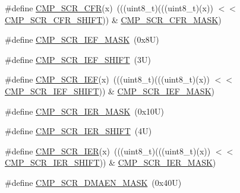 \begin{DoxyCompactItemize}
\#define \mbox{\hyperlink{group___c_m_p___register___masks_gae9adf37fae856f25e1caf7b4a48a7912}{C\+M\+P\+\_\+\+S\+C\+R\+\_\+\+C\+FR}}(x)~(((uint8\+\_\+t)(((uint8\+\_\+t)(x)) $<$$<$ \mbox{\hyperlink{group___c_m_p___register___masks_ga78595d16db987c96e73ce96fc5436f6b}{C\+M\+P\+\_\+\+S\+C\+R\+\_\+\+C\+F\+R\+\_\+\+S\+H\+I\+FT}})) \& \mbox{\hyperlink{group___c_m_p___register___masks_ga876bfa2799338c6b10b152940d25c4a7}{C\+M\+P\+\_\+\+S\+C\+R\+\_\+\+C\+F\+R\+\_\+\+M\+A\+SK}})
\item 
\#define \mbox{\hyperlink{group___c_m_p___register___masks_gab36859944bb484db243358bb9a1a9692}{C\+M\+P\+\_\+\+S\+C\+R\+\_\+\+I\+E\+F\+\_\+\+M\+A\+SK}}~(0x8\+U)
\item 
\#define \mbox{\hyperlink{group___c_m_p___register___masks_gaa9d242eac081d0d572e120ea3afa0e6f}{C\+M\+P\+\_\+\+S\+C\+R\+\_\+\+I\+E\+F\+\_\+\+S\+H\+I\+FT}}~(3\+U)
\item 
\#define \mbox{\hyperlink{group___c_m_p___register___masks_ga4cedf2626e72a16419c72b4bc802063e}{C\+M\+P\+\_\+\+S\+C\+R\+\_\+\+I\+EF}}(x)~(((uint8\+\_\+t)(((uint8\+\_\+t)(x)) $<$$<$ \mbox{\hyperlink{group___c_m_p___register___masks_gaa9d242eac081d0d572e120ea3afa0e6f}{C\+M\+P\+\_\+\+S\+C\+R\+\_\+\+I\+E\+F\+\_\+\+S\+H\+I\+FT}})) \& \mbox{\hyperlink{group___c_m_p___register___masks_gab36859944bb484db243358bb9a1a9692}{C\+M\+P\+\_\+\+S\+C\+R\+\_\+\+I\+E\+F\+\_\+\+M\+A\+SK}})
\item 
\#define \mbox{\hyperlink{group___c_m_p___register___masks_ga2fbc99fb91c41e37b82ecabda7a9f0c7}{C\+M\+P\+\_\+\+S\+C\+R\+\_\+\+I\+E\+R\+\_\+\+M\+A\+SK}}~(0x10\+U)
\item 
\#define \mbox{\hyperlink{group___c_m_p___register___masks_ga24fc92779af70d4d7fc87102c53b86ca}{C\+M\+P\+\_\+\+S\+C\+R\+\_\+\+I\+E\+R\+\_\+\+S\+H\+I\+FT}}~(4\+U)
\item 
\#define \mbox{\hyperlink{group___c_m_p___register___masks_ga663074e77d49fc2f2a715957bbcb76c1}{C\+M\+P\+\_\+\+S\+C\+R\+\_\+\+I\+ER}}(x)~(((uint8\+\_\+t)(((uint8\+\_\+t)(x)) $<$$<$ \mbox{\hyperlink{group___c_m_p___register___masks_ga24fc92779af70d4d7fc87102c53b86ca}{C\+M\+P\+\_\+\+S\+C\+R\+\_\+\+I\+E\+R\+\_\+\+S\+H\+I\+FT}})) \& \mbox{\hyperlink{group___c_m_p___register___masks_ga2fbc99fb91c41e37b82ecabda7a9f0c7}{C\+M\+P\+\_\+\+S\+C\+R\+\_\+\+I\+E\+R\+\_\+\+M\+A\+SK}})
\item 
\#define \mbox{\hyperlink{group___c_m_p___register___masks_ga217e649d3512ff1bba2c22885d768148}{C\+M\+P\+\_\+\+S\+C\+R\+\_\+\+D\+M\+A\+E\+N\+\_\+\+M\+A\+SK}}~(0x40\+U)
\item 
$$
\end{DoxyCompactItemize}
